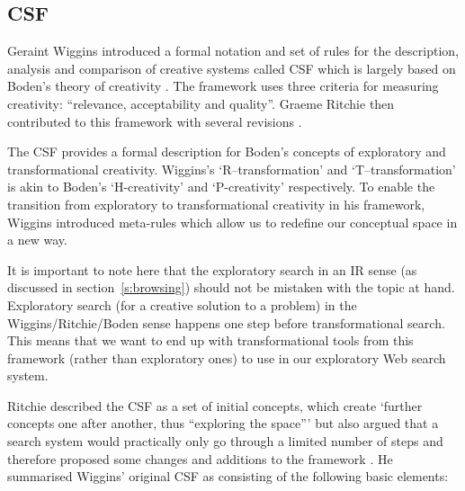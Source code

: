 \subsection{CSF}
\label{s:csf}

Geraint Wiggins introduced a formal notation and set of rules for the description, analysis and comparison of creative systems called \ac{CSF}\autocite*{Wiggins2006} which is largely based on Boden's theory of creativity \autocite*{Boden2003}. The framework uses three criteria for measuring creativity: ``relevance, acceptability and quality''. Graeme Ritchie then contributed to this framework with several revisions \autocite*{Ritchie2012}.

The \ac{CSF} provides a formal description for Boden's concepts of exploratory and transformational creativity. Wiggins's `R–transformation' and `T–transformation' is akin to Boden's `H-creativity' and `P-creativity' respectively. To enable the transition from exploratory to transformational creativity in his framework, Wiggins introduced meta-rules which allow us to redefine our conceptual space in a new way.

It is important to note here that the exploratory search in an \ac{IR} sense (as discussed in section~\ref{s:browsing}) should not be mistaken with the topic at hand. Exploratory search (for a creative solution to a problem) in the Wiggins/Ritchie/Boden sense happens one step before transformational search. This means that we want to end up with transformational tools from this framework (rather than exploratory ones) to use in our exploratory Web search system.

Ritchie described the \ac{CSF} as a set of initial concepts, which create `further concepts one after another, thus ``exploring the space''' but also argued that a search system would practically only go through a limited number of steps and therefore proposed some changes and additions to the framework \autocite*{Ritchie2012}. He summarised Wiggins' original \ac{CSF} as consisting of the following basic elements:


